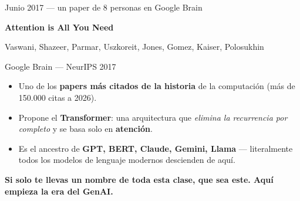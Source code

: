 \documentclass[aspectratio=169, 11pt]{beamer}
\begin{document}
\begin{frame}[shrink]{Junio 2017 --- un paper de 8 personas en Google Brain}
  \vspace{2pt}
  \begin{center}
  \begin{tcolorbox}[colback=arcaDark, colframe=arcaDark, sharp corners,
    left=14pt, right=14pt, top=10pt, bottom=10pt, width=0.82\textwidth]
    {\Large\color{white}\bfseries Attention is All You Need\par}
    \vspace{4pt}
    {\footnotesize\color{white!85}Vaswani, Shazeer, Parmar, Uszkoreit, Jones, Gomez, Kaiser, Polosukhin\par}
    {\footnotesize\color{white!70}Google Brain --- NeurIPS 2017\par}
  \end{tcolorbox}
  \end{center}
  \vspace{10pt}
  \begin{itemize}\setlength{\itemsep}{4pt}
    \footnotesize
    \item Uno de los \textbf{papers más citados de la historia} de la computación
    (más de 150.000 citas a 2026).
    \item Propone el \textbf{Transformer}: una arquitectura que \emph{elimina la recurrencia
    por completo} y se basa solo en \textbf{atención}.
    \item Es el ancestro de \textbf{GPT, BERT, Claude, Gemini, Llama} --- literalmente
    todos los modelos de lenguaje modernos descienden de aquí.
  \end{itemize}
  \vspace{4pt}
  \begin{tcolorbox}[colback=arcaRed!8, colframe=arcaRed, leftrule=3pt,
    boxrule=0pt, sharp corners, left=8pt, right=8pt, top=3pt, bottom=3pt]
    {\footnotesize\color{arcaDark}\bfseries
    Si solo te llevas un nombre de toda esta clase, que sea este. Aquí empieza
    la era del GenAI.}
  \end{tcolorbox}
\end{frame}
\end{document}
